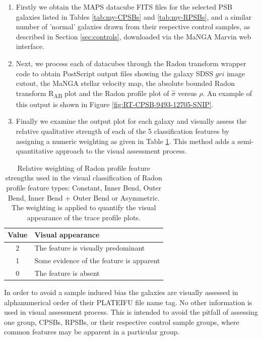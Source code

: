\begin{enumerate}
    \item Firstly we obtain the MAPS datacube FITS files for the selected PSB galaxies listed in Tables \ref{tab:my-CPSBs} and \ref{tab:my-RPSBs}, and a similar number of 'normal' galaxies drawn from their respective control samples, as described in Section \ref{sec:controls}, downloaded via the MaNGA Marvin web interface.
    \item Next, we process each of datacubes through the Radon transform wrapper code to obtain PostScript output files showing the galaxy SDSS $gri$ image cutout, the MaNGA stellar velocity map, the absolute bounded Radon transform R\textsubscript{AB} plot and the Radon profile plot of $\hat{\sigma}$ versus $\rho$. An example of this output is shown in Figure \ref{fig:RT-CPSB-9493-12705-SNIP}. 
    \item  Finally we examine the output plot for each galaxy and visually assess the relative qualitative strength of each of the 5 classification features by assigning a numeric weighting as given in Table \ref{tab:features}. This method adds a semi-quantitative approach to the visual assessment process.
\end{enumerate}

\begin{table}
    \caption{Relative weighting of Radon profile feature strengths used in the  visual classification of Radon profile feature types: Constant, Inner Bend, Outer Bend, Inner Bend + Outer Bend or Asymmetric. The weighting is applied to quantify the visual appearance of the trace profile plots.}
    \label{tab:features}
    \centering
    \begin{tabular}{cl}
    \hline
    Value & Visual appearance \\
    \hline
    2 & The feature is visually predominant \\
    1 & Some evidence of the feature is apparent \\
    0 & The feature is absent \\
    \hline
    \end{tabular}

\end{table}

In order to avoid a sample induced bias the galaxies are visually assessed in alphanumerical order of their PLATEIFU file name tag. No other information is used in visual assessment process. This is intended to avoid the pitfall of assessing one group, CPSBs, RPSBs, or their respective control sample groups, where common features may be apparent in a particular group. 

